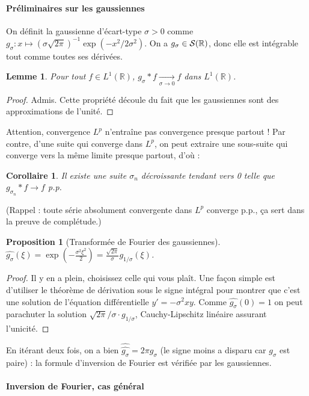 \documentclass[a4paper, 11pt]{article}
\def\R{\mathbb{R}}
\def\S{{\cal{S}}}
\newtheorem*{proposition}{Proposition}
\newtheorem*{lemma}{Lemme}
\newtheorem*{corollary}{Corollaire}
\begin{document}
\paragraph{Préliminaires sur les gaussiennes}
On définit la gaussienne d'écart-type $\sigma > 0$ comme $g_\sigma : x \mapsto
(\sigma\sqrt{2\pi})^{-1}\exp(-x^2/2\sigma^2)$. On a $g_\sigma \in \S(\R)$, donc
elle est intégrable tout comme toutes ses dérivées.

\begin{lemma}
  Pour tout $f \in L^1(\R)$,
  $g_\sigma * f \underset{\sigma \to 0}{\longrightarrow} f$ dans $L^1(\R)$.
\end{lemma}
\begin{proof}
  Admis. Cette propriété découle du fait que les gaussiennes sont des
  approximations de l'unité.
\end{proof}

Attention, convergence $L^p$ n'entraîne pas convergence presque partout ! Par
contre, d'une suite qui converge dans $L^p$, on peut extraire une sous-suite qui
converge vers la même limite presque partout, d'où :
\begin{corollary}
  Il existe une suite $\sigma_n$ décroissante tendant vers 0 telle que
  $g_{\sigma_n} * f \rightarrow f$ p.p.
\end{corollary}
(Rappel : toute série absolument convergente dans $L^p$ converge p.p., ça
sert dans la preuve de complétude.)

\begin{proposition}[Transformée de Fourier des gaussiennes]
  $\displaystyle \widehat{g_\sigma}(\xi) =
  \exp\left(- \frac{\sigma^2 \xi^2}{2} \right) =
  \frac{\sqrt{2\pi}}{\sigma} g_{1/\sigma}(\xi)$.
\end{proposition}
\begin{proof}
  Il y en a plein, choisissez celle qui vous plaît. Une façon simple est
  d'utiliser le théorème de dérivation sous le signe intégral pour montrer que
  c'est une solution de l'équation différentielle $y' = -\sigma^2xy $. Comme
  $\widehat{g_\sigma}(0) = 1$ on peut parachuter la solution $\sqrt{2\pi}/\sigma
  \cdot g_{1/\sigma}$, Cauchy-Lipschitz linéaire assurant l'unicité.
\end{proof}

En itérant deux fois, on a bien $\widehat{\widehat{g_{\sigma}}} = 2\pi g_\sigma$
(le signe moins a disparu car $g_\sigma$ est paire) : la formule d'inversion de
Fourier est vérifiée par les gaussiennes.

\paragraph{Inversion de Fourier, cas général}
\end{document}

